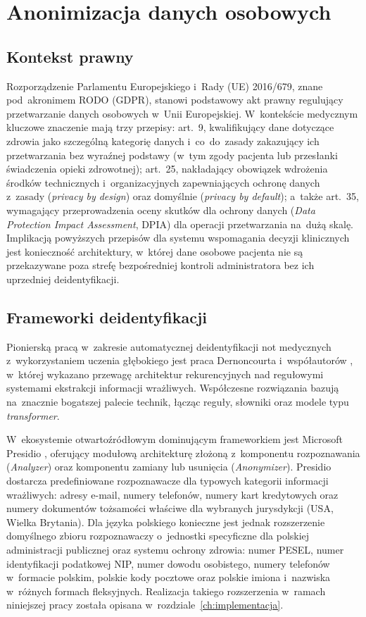 \section{Anonimizacja danych osobowych}\label{sec:anonimizacja}

\subsection{Kontekst prawny}

Rozporządzenie Parlamentu Europejskiego i~Rady (UE) 2016/679, znane
pod~akronimem RODO (GDPR), \parencite{gdpr2016} stanowi podstawowy
akt prawny regulujący przetwarzanie danych osobowych w~Unii
Europejskiej. W~kontekście medycznym kluczowe znaczenie mają trzy
przepisy: art.~9, kwalifikujący dane dotyczące zdrowia jako
szczególną kategorię danych i~co~do~zasady zakazujący ich
przetwarzania bez wyraźnej podstawy (w~tym zgody pacjenta lub
przesłanki świadczenia opieki zdrowotnej); art.~25, nakładający
obowiązek wdrożenia środków technicznych i~organizacyjnych
zapewniających ochronę danych z~zasady (\emph{privacy by design})
oraz domyślnie (\emph{privacy by default}); a~także art.~35,
wymagający przeprowadzenia oceny skutków dla ochrony danych
(\emph{Data Protection Impact Assessment}, DPIA) dla operacji
przetwarzania na~dużą skalę. Implikacją powyższych przepisów dla
systemu wspomagania decyzji klinicznych jest konieczność architektury,
w~której dane osobowe pacjenta nie są przekazywane poza strefę
bezpośredniej kontroli administratora bez ich uprzedniej
deidentyfikacji.

\subsection{Frameworki deidentyfikacji}

Pionierską pracą w~zakresie automatycznej deidentyfikacji not
medycznych z~wykorzystaniem uczenia głębokiego jest praca
Dernoncourta i~współautorów \parencite{dernoncourt2017}, w~której
wykazano przewagę architektur rekurencyjnych nad regułowymi systemami
ekstrakcji informacji wrażliwych. Współczesne rozwiązania bazują
na~znacznie bogatszej palecie technik, łącząc reguły, słowniki oraz
modele typu \emph{transformer}.

W~ekosystemie otwartoźródłowym dominującym frameworkiem jest Microsoft
Presidio \parencite{presidio-docs}, oferujący modułową architekturę
złożoną z~komponentu rozpoznawania (\emph{Analyzer}) oraz komponentu
zamiany lub usunięcia (\emph{Anonymizer}). Presidio dostarcza
predefiniowane rozpoznawacze dla typowych kategorii informacji
wrażliwych: adresy e-mail, numery telefonów, numery kart kredytowych
oraz numery dokumentów tożsamości właściwe dla wybranych jurysdykcji
(USA, Wielka Brytania). Dla języka polskiego konieczne jest jednak
rozszerzenie domyślnego zbioru rozpoznawaczy o~jednostki specyficzne
dla polskiej administracji publicznej oraz systemu ochrony zdrowia:
numer PESEL, numer identyfikacji podatkowej NIP, numer dowodu
osobistego, numery telefonów w~formacie polskim, polskie kody
pocztowe oraz polskie imiona i~nazwiska w~różnych formach fleksyjnych.
Realizacja takiego rozszerzenia w~ramach niniejszej pracy została
opisana w~rozdziale~\ref{ch:implementacja}.

